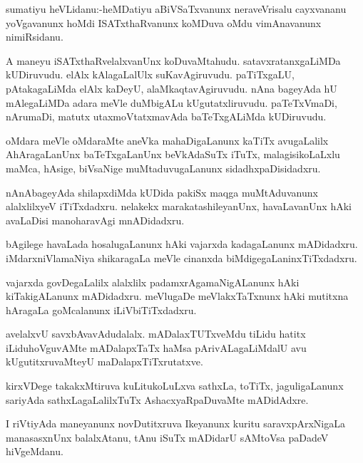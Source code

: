 \documentclass{article}
\begin{document}
\begin{mn}%
sumatiyu heVLidanu:-heMDatiyu aBiVSaTxvanunx neraveVrisalu cayxvananu yoVgavanunx hoMdi 
ISATxthaRvanunx koMDuva oMdu vimAnavanunx nimiRsidanu.
\end{mn}

\begin{mn}%
A maneyu iSATxthaRvelalxvanUnx koDuvaMtahudu. satavxratanxgaLiMDa kUDiruvudu. elAlx 
kAlagaLalUlx suKavAgiruvudu. paTiTxgaLU, pAtakagaLiMda elAlx kaDeyU, alaMkaqtavAgiruvudu. 
nAna bageyAda hU mAlegaLiMDa adara meVle duMbigALu kUgutatxliruvudu. paTeTxVmaDi, 
nArumaDi, matutx utaxmoVtatxmavAda baTeTxgALiMda kUDiruvudu.
\end{mn}

\begin{mn}%
oMdara meVle oMdaraMte aneVka mahaDigaLanunx kaTiTx avugaLalilx AhAragaLanUnx 
baTeTxgaLanUnx beVkAdaSuTx iTuTx, malagisikoLaLxlu maMca, hAsige, biVsaNige 
muMtaduvugaLanunx sidadhxpaDisidadxru.
\end{mn}

\begin{mn}%
nAnAbageyAda shilapxdiMda kUDida pakiSx maqga muMtAduvanunx alalxlilxyeV iTiTxdadxru. 
nelakekx marakatashileyanUnx, havaLavanUnx hAki avaLaDisi manoharavAgi mnADidadxru.
\end{mn}

\begin{mn}%
bAgilege havaLada hosalugaLanunx hAki vajarxda kadagaLanunx mADidadxru. iMdarxniVlamaNiya 
shikaragaLa meVle cinanxda biMdigegaLaninxTiTxdadxru.
\end{mn}

\begin{mn}%
vajarxda govDegaLalilx alalxlilx padamxrAgamaNigALanunx hAki kiTakigALanunx mADidadxru. 
meVlugaDe meVlakxTaTxnunx hAki mutitxna hAragaLa goMcalanunx iLiVbiTiTxdadxru.
\end{mn}

\begin{mn}%
avelalxvU savxbAvavAdudalalx. mADalaxTUTxveMdu tiLidu hatitx iLiduhoVguvAMte mADalapxTaTx 
haMsa pArivALagaLiMdalU avu kUgutitxruvaMteyU maDalapxTiTxrutatxve.
\end{mn}

\begin{mn}%
kirxVDege takakxMtiruva kuLitukoLuLxva sathxLa, toTiTx, jaguligaLanunx sariyAda 
sathxLagaLalilxTuTx AshacxyaRpaDuvaMte mADidAdxre.
\end{mn}

\begin{mn}%
I riVtiyAda maneyanunx novDutitxruva Ikeyanunx kuritu saravxpArxNigaLa manasasxnUnx 
balalxAtanu, tAnu iSuTx mADidarU sAMtoVsa paDadeV hiVgeMdanu.
\end{mn}
\end{document}
